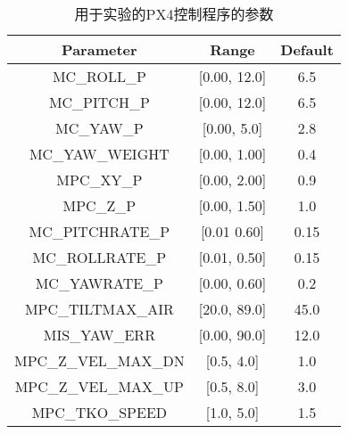 \begin{table}[ht]
\small
\caption{用于实验的PX4控制程序的参数}
\label{tab:range_paramall_px4}
\centering
\begin{tabular}{ccc}
        \toprule[1.5pt]
          Parameter & Range & Default \\
        \midrule[0.8pt]
         MC\_ROLL\_P & [0.00, 12.0] & 6.5 \\
       
         MC\_PITCH\_P & [0.00, 12.0] & 6.5 \\ 
       
         MC\_YAW\_P & [0.00, 5.0] & 2.8 \\ 
        
         MC\_YAW\_WEIGHT & [0.00, 1.00] & 0.4 \\ 
        
         MPC\_XY\_P & [0.00, 2.00] & 0.9 \\ 
        
         MPC\_Z\_P & [0.00, 1.50] & 1.0 \\ 
        
         MC\_PITCHRATE\_P & [0.01 0.60] & 0.15 \\ 
        
         MC\_ROLLRATE\_P & [0.01, 0.50] & 0.15  \\ 
        
         MC\_YAWRATE\_P & [0.00, 0.60] & 0.2 \\ 
        
         MPC\_TILTMAX\_AIR & [20.0, 89.0] & 45.0 \\ 
        
         MIS\_YAW\_ERR & [0.00, 90.0] & 12.0 \\
        
         MPC\_Z\_VEL\_MAX\_DN & [0.5, 4.0] & 1.0 \\
        
         MPC\_Z\_VEL\_MAX\_UP & [0.5, 8.0] & 3.0 \\
        
         MPC\_TKO\_SPEED & [1.0, 5.0] & 1.5  \\
        
        \bottomrule[1.5pt]
\end{tabular}
\end{table}

       
